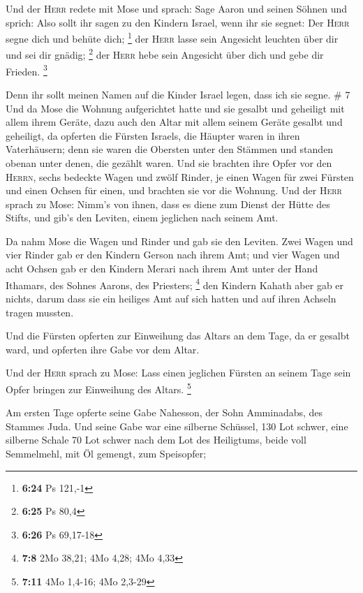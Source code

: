  Und der \textsc{Herr} redete mit Mose und sprach:
 Sage Aaron und seinen Söhnen und sprich: Also sollt ihr
sagen zu den Kindern Israel, wenn ihr sie segnet:  Der
\textsc{Herr} segne dich und behüte dich; \footnote{\textbf{6:24} Ps
  121,-1}  der \textsc{Herr} lasse sein Angesicht
leuchten über dir und sei dir gnädig; \footnote{\textbf{6:25} Ps 80,4}
 der \textsc{Herr} hebe sein Angesicht über dich und gebe
dir Frieden. \footnote{\textbf{6:26} Ps 69,17-18}

 Denn ihr sollt meinen Namen auf die Kinder Israel legen,
dass ich sie segne. \# 7  Und da Mose die Wohnung
aufgerichtet hatte und sie gesalbt und geheiligt mit allem ihrem Geräte,
dazu auch den Altar mit allem seinem Geräte gesalbt und geheiligt,
 da opferten die Fürsten Israels, die Häupter waren in
ihren Vaterhäusern; denn sie waren die Obersten unter den Stämmen und
standen obenan unter denen, die gezählt waren.  Und sie
brachten ihre Opfer vor den \textsc{Herrn}, sechs bedeckte Wagen und
zwölf Rinder, je einen Wagen für zwei Fürsten und einen Ochsen für
einen, und brachten sie vor die Wohnung.  Und der
\textsc{Herr} sprach zu Mose:  Nimm's von ihnen, dass es
diene zum Dienst der Hütte des Stifts, und gib's den Leviten, einem
jeglichen nach seinem Amt.

 Da nahm Mose die Wagen und Rinder und gab sie den
Leviten.  Zwei Wagen und vier Rinder gab er den Kindern
Gerson nach ihrem Amt;  und vier Wagen und acht Ochsen gab
er den Kindern Merari nach ihrem Amt unter der Hand Ithamars, des Sohnes
Aarons, des Priesters; \footnote{\textbf{7:8} 2Mo 38,21; 4Mo 4,28; 4Mo
  4,33}  den Kindern Kahath aber gab er nichts, darum dass
sie ein heiliges Amt auf sich hatten und auf ihren Achseln tragen
mussten.

 Und die Fürsten opferten zur Einweihung das Altars an
dem Tage, da er gesalbt ward, und opferten ihre Gabe vor dem Altar.

 Und der \textsc{Herr} sprach zu Mose: Lass einen
jeglichen Fürsten an seinem Tage sein Opfer bringen zur Einweihung des
Altars. \footnote{\textbf{7:11} 4Mo 1,4-16; 4Mo 2,3-29}

 Am ersten Tage opferte seine Gabe Nahesson, der Sohn
Amminadabs, des Stammes Juda.  Und seine Gabe war eine
silberne Schüssel, 130 Lot schwer, eine silberne Schale 70 Lot schwer
nach dem Lot des Heiligtums, beide voll Semmelmehl, mit Öl gemengt, zum
Speisopfer;

